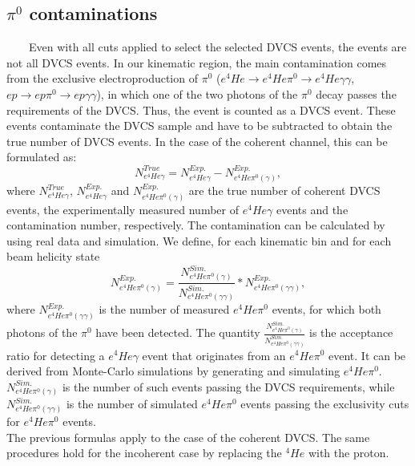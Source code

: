 \subsection{$\pi^0$ contaminations}
~~~~Even with all cuts applied to select the selected DVCS events, the events 
are not all DVCS events. In our kinematic region, the main contamination comes 
from the exclusive electroproduction of $\pi^{0}$ ($e ^{4}He \rightarrow e 
^{4}He \pi^{0} \rightarrow e ^{4}He \gamma \gamma $, $e p \rightarrow e p 
\pi^{0} \rightarrow e p \gamma \gamma $), in which one of the two photons of 
the $\pi^{0}$ decay passes the requirements of the DVCS. Thus, the event is 
counted as a DVCS event. These events contaminate the DVCS sample and have to 
be subtracted to obtain the true number of DVCS events. In the case of the 
coherent channel, this can be formulated as:
\begin{equation}
N^{True}_{e^{4}He\gamma} = N^{Exp.}_{e^{4}He\gamma} -  N^{Exp.}_{e^{4}He\pi^{0}(\gamma)},
\label{equ_back_1}
\end{equation}
where $N^{True}_{e^{4}He\gamma}$, $N^{Exp.}_{e^{4}He\gamma}$ and $ 
N^{Exp.}_{e^{4}He\pi^{0}(\gamma)}$ are the true number of coherent DVCS events, 
the experimentally measured number of $e^{4}He\gamma$ events and the 
contamination number, respectively. The contamination can be calculated by 
using real data and simulation. We define, for each kinematic bin and for each 
beam helicity state
\begin{equation}
N^{Exp.}_{e^{4}He\pi^{0}(\gamma)} = 
\frac{N^{Sim.}_{e^{4}He\pi^{0}(\gamma)}}{N^{Sim.}_{e^{4}He\pi^{0}(\gamma 
\gamma)}} * N^{Exp.}_{e^{4}He\pi^{0}(\gamma \gamma)},
\label{equation: background_equ}
\end{equation}
where $N^{Exp.}_{e^{4}He\pi^{0}(\gamma \gamma)}$ is the number of measured 
$e^{4}He\pi^{0}$ events, for which both photons of the $\pi^{0}$ have been 
detected. The quantity 
$\frac{N^{Sim.}_{e^{4}He\pi^{0}(\gamma)}}{N^{Sim.}_{e^{4}He\pi^{0}(\gamma 
\gamma)}} $ is the acceptance ratio for detecting a $e^{4}He\gamma$ event that 
originates from an $e^{4}He\pi^{0}$ event. It can be derived from Monte-Carlo 
simulations by generating and simulating $e^{4}He\pi^{0}$.  
$N^{Sim.}_{e^{4}He\pi^{0}(\gamma)}$ is the number of such events passing the 
DVCS requirements, while $N^{Sim.}_{e^{4}He\pi^{0}(\gamma \gamma)}$ is the 
number of simulated $e^{4}He\pi^{0}$ events passing the exclusivity cuts for 
$e^{4}He\pi^{0}$ events.\\

The previous formulas apply to the case of the coherent DVCS. The same 
procedures hold for the incoherent case by replacing the $^{4}He$ with the 
proton.\\

